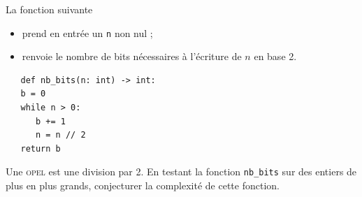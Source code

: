 \begin{exercice}
   La fonction suivante 
   \begin{itemize}
      \item prend en entrée un \texttt{n} non nul ;
      \item renvoie le nombre de bits nécessaires à l'écriture de $n$ en base 2. 
   \end{itemize}
   
   \begin{verbatim}
   def nb_bits(n: int) -> int:
   b = 0
   while n > 0:
      b += 1
      n = n // 2
   return b
   \end{verbatim}
   Une \textsc{opel} est une division par 2. En testant la fonction \texttt{nb_bits} sur des entiers de plus en plus grands, conjecturer la complexité de cette fonction. 

\end{exercice}

